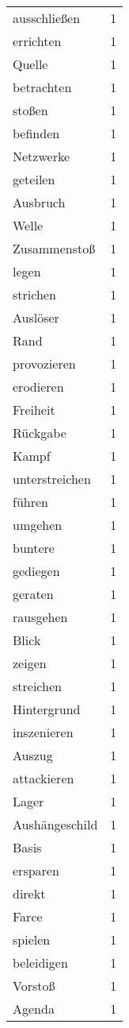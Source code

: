 \begin{tabular}{lr}
ausschließen & 1 \\
errichten & 1 \\
Quelle & 1 \\
betrachten & 1 \\
stoßen & 1 \\
befinden & 1 \\
Netzwerke & 1 \\
geteilen & 1 \\
Ausbruch & 1 \\
Welle & 1 \\
Zusammenstoß & 1 \\
legen & 1 \\
strichen & 1 \\
Auslöser & 1 \\
Rand & 1 \\
provozieren & 1 \\
erodieren & 1 \\
Freiheit & 1 \\
Rückgabe & 1 \\
Kampf & 1 \\
unterstreichen & 1 \\
führen & 1 \\
umgehen & 1 \\
buntere & 1 \\
gediegen & 1 \\
geraten & 1 \\
rausgehen & 1 \\
Blick & 1 \\
zeigen & 1 \\
streichen & 1 \\
Hintergrund & 1 \\
inszenieren & 1 \\
Auszug & 1 \\
attackieren & 1 \\
Lager & 1 \\
Aushängeschild & 1 \\
Basis & 1 \\
ersparen & 1 \\
direkt & 1 \\
Farce & 1 \\
spielen & 1 \\
beleidigen & 1 \\
Vorstoß & 1 \\
Agenda & 1 \\
\bottomrule
\end{tabular}
